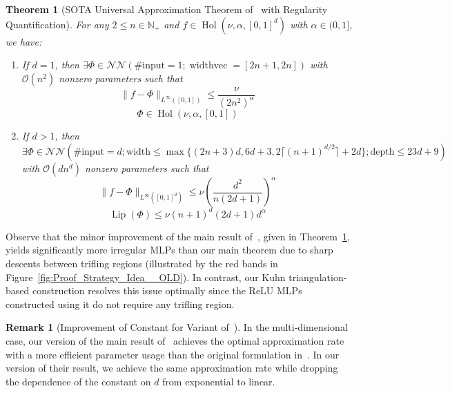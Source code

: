 \documentclass{article}
\numberwithin{equation}{section}
\newtheorem{theorem}{Theorem}[section]
\theoremstyle{definition}
\newtheorem{remark}{Remark}[section]
\begin{document}
\begin{theorem}[{SOTA Universal Approximation Theorem of~\cite{ShenYangZhang_JMPA_OptApprx_ReLU} with Regularity Quantification}]
\label{thm:main_SOTA_Benchmark}
    For any $2\le n\in\mathbb{N}_+$ and $f\in\operatorname{Hol}(\nu,\alpha,[0,1]^d)$ with $\alpha\in(0,1]$, we have:
    \begin{enumerate}
        \item If $d=1$, then $\exists\Phi\in\mathcal{NN}(\#\text{input}=1; \operatorname{widthvec}=[2n+1,2n])$ with $\mathcal{O}(n^2)$ nonzero parameters such that 
        $$\|f-\Phi\|_{L^{\infty}([0,1])} \le \frac{\nu}{\left(2n^2\right)^{\alpha}}$$
        $$\Phi\in\operatorname{Hol}(\nu,\alpha,[0,1])$$
        \item If $d>1$, then $\exists\Phi\in\mathcal{NN}(\#\text{input}=d; \text{width} \le \max \{(2n+3)d, 6d+3, 2\lceil (n+1)^{d/2} \rceil+2d \};\text{depth} \le 23d+9)$ with $\mathcal{O}(dn^d)$ nonzero parameters such that
        $$\|f-\Phi\|_{L^{\infty}([0,1]^d)} \le \nu \left( 
        \frac{d^2}{n(2d+1)}
        \right)^{\alpha}$$
        $$\operatorname{Lip}(\Phi) \le 
        \nu (n+1)^d (2d+1) d^{\alpha}$$
    \end{enumerate}
\end{theorem}
Observe that the minor improvement of the main result of~\cite{ShenYangZhang_JMPA_OptApprx_ReLU}, given in Theorem~\ref{thm:main_SOTA_Benchmark}, yields significantly more irregular MLPs than our main theorem due to sharp descents between trifling regions (illustrated by the red bands in Figure~\ref{fig:Proof_Strategy_Idea__OLD}).  
In contrast, our Kuhn triangulation-based construction resolves this issue optimally since the ReLU MLPs constructed using it do not require any trifling region.

\begin{remark}[{Improvement of Constant for Variant of~\cite[Theorem 1.1]{ShenYangZhang_JMPA_OptApprx_ReLU}}]
In the multi-dimensional case, our version of the main result of~\cite{ShenYangZhang_JMPA_OptApprx_ReLU} achieves the optimal approximation rate with a more efficient parameter usage than the original formulation in~\cite{ShenYangZhang_JMPA_OptApprx_ReLU}.  
In our version of their result, we achieve the same approximation rate while dropping the dependence of the constant on $d$ from exponential to linear.
\end{remark}





\end{document}
